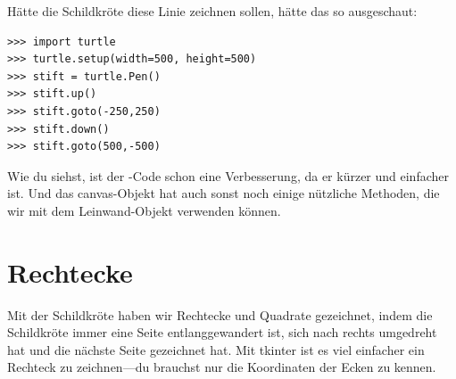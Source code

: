 \noindent
Hätte die Schildkröte diese Linie zeichnen sollen, hätte das so ausgeschaut:

\begin{Verbatim}[frame=single]
>>> import turtle
>>> turtle.setup(width=500, height=500)
>>> stift = turtle.Pen()
>>> stift.up()
>>> stift.goto(-250,250)
>>> stift.down()
>>> stift.goto(500,-500)
\end{Verbatim}

Wie du siehst, ist der -Code schon eine Verbesserung, da er kürzer und einfacher ist. Und das canvas-Objekt hat auch sonst noch einige nützliche Methoden, die wir mit dem Leinwand-Objekt verwenden können.

\section{Rechtecke}

Mit der Schildkröte haben wir Rechtecke und Quadrate gezeichnet, indem die Schildkröte immer eine Seite entlanggewandert ist, sich nach rechts umgedreht hat und die nächste Seite gezeichnet hat. Mit tkinter ist es viel einfacher ein Rechteck zu zeichnen---du brauchst nur die Koordinaten der Ecken zu kennen.


